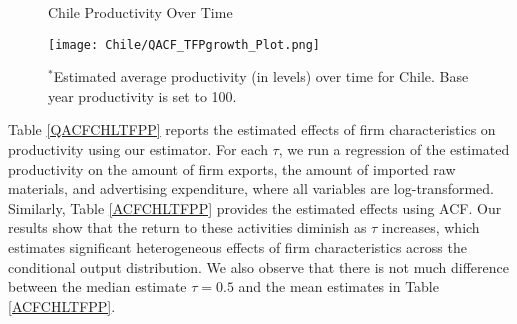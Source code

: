 \documentclass[12pt]{article}
\begin{document}
\begin{figure}[H]
	\centering
	\caption{Chile Productivity Over Time}
	\texttt{[image: Chile/QACF\_TFPgrowth\_Plot.png]}
	\caption*{\footnotesize $^{*}$Estimated average productivity (in levels) over time for Chile. Base year productivity is set to 100.}
	\label{fig:QACFCHLTFPG}
\end{figure}

Table \ref{QACFCHLTFPP} reports the estimated effects of firm characteristics on productivity using our estimator. For each $\tau$, we run a regression of the estimated productivity on the amount of firm exports, the amount of imported raw materials, and advertising expenditure, where all variables are log-transformed. Similarly, Table \ref{ACFCHLTFPP} provides the estimated effects using ACF. Our results show that the return to these activities diminish as $\tau$ increases, which estimates significant heterogeneous effects of firm characteristics across the conditional output distribution.  We also observe that there is not much difference between the median estimate $\tau=0.5$ and the mean estimates in Table \ref{ACFCHLTFPP}.
\end{document}
